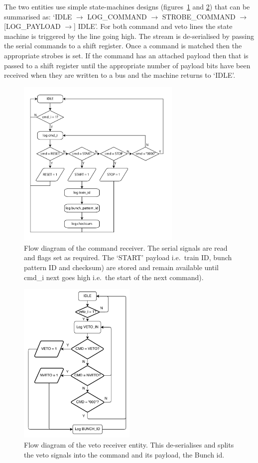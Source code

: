 The two entities use simple state-machines designs (figures~\ref{fig:cmd_rx_flow} and \ref{fig:veto_rx_flow}) that can be summarised as: `IDLE \( \rightarrow \) LOG\_COMMAND \( \rightarrow \) STROBE\_COMMAND \( \rightarrow \) [LOG\_PAYLOAD \( \rightarrow \)] IDLE'. For both command and veto lines the state machine is triggered by the line going high. The stream is de-serialised by passing the serial commands to a shift register. Once a command is matched then the appropriate strobes is set. If the command has an attached payload then that is passed to a shift register until the appropriate number of payload bits have been received when they are written to a bus and the machine returns to `IDLE'.
\begin{figure}[htbp]
  \centering
  \includegraphics[width=0.7\textwidth]{images/pdfs/cmd_rx_flow.pdf}
  \caption{Flow diagram of the command receiver. The serial signals are read and flags set as required. The `START' payload i.e.\  train ID, bunch pattern ID and checksum) are stored and remain available until cmd\_i next goes high i.e.\  the start of the next command).}
  \label{fig:cmd_rx_flow}
\end{figure}
\begin{figure}[htbp]
  \centering
  \includegraphics[width=0.5\textwidth]{images/pdfs/veto_rx_flow.pdf}
  \caption{Flow diagram of the veto receiver entity. This de-serialises and splits the veto signals into the command and its payload, the Bunch id.}
  \label{fig:veto_rx_flow}
\end{figure}

